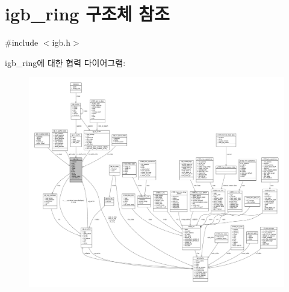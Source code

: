 \hypertarget{structigb__ring}{}\section{igb\+\_\+ring 구조체 참조}
\label{structigb__ring}


{\ttfamily \#include $<$igb.\+h$>$}



igb\+\_\+ring에 대한 협력 다이어그램\+:
\nopagebreak
\begin{figure}[H]
\begin{center}
\leavevmode
\includegraphics[width=350pt]{structigb__ring__coll__graph}
\end{center}
\end{figure}
